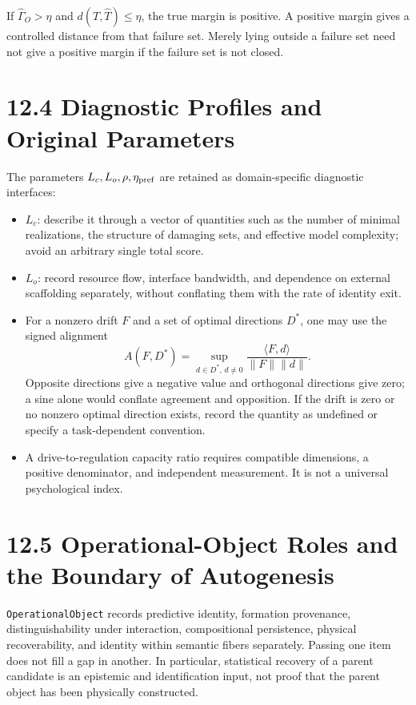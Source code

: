 \documentclass[
  english,
  11pt,
  oneside]{book}
\providecommand{\tightlist}{%
  \setlength{\itemsep}{0pt}\setlength{\parskip}{0pt}}
\begin{document}
If \(\widehat\Gamma_O>\eta\) and \(d(T,\widehat T)\le\eta\), the true margin is positive. A positive margin gives a controlled distance from that failure set. Merely lying outside a failure set need not give a positive margin if the failure set is not closed.

\section{12.4 Diagnostic Profiles and Original Parameters}\label{diagnostic-profiles-and-original-parameters}

The parameters \(L_c,L_o,\rho,\eta_{\rm pref}\) are retained as domain-specific diagnostic interfaces:

\begin{itemize}
\tightlist
\item
  \(L_c\): describe it through a vector of quantities such as the number of minimal realizations, the structure of damaging sets, and effective model complexity; avoid an arbitrary single total score.
\item
  \(L_o\): record resource flow, interface bandwidth, and dependence on external scaffolding separately, without conflating them with the rate of identity exit.
\item
  For a nonzero drift \(F\) and a set of optimal directions \(D^*\), one may use the signed alignment \[A(F,D^*)=\sup_{d\in D^*,\,d\ne0}
  \frac{\langle F,d\rangle}{\|F\|\|d\|}.\] Opposite directions give a negative value and orthogonal directions give zero; a sine alone would conflate agreement and opposition. If the drift is zero or no nonzero optimal direction exists, record the quantity as undefined or specify a task-dependent convention.
\item
  A drive-to-regulation capacity ratio requires compatible dimensions, a positive denominator, and independent measurement. It is not a universal psychological index.
\end{itemize}

\section{12.5 Operational-Object Roles and the Boundary of Autogenesis}\label{operational-object-roles-and-the-boundary-of-autogenesis}

\nolinkurl{OperationalObject} records predictive identity, formation provenance, distinguishability under interaction, compositional persistence, physical recoverability, and identity within semantic fibers separately. Passing one item does not fill a gap in another. In particular, statistical recovery of a parent candidate is an epistemic and identification input, not proof that the parent object has been physically constructed.
\end{document}
